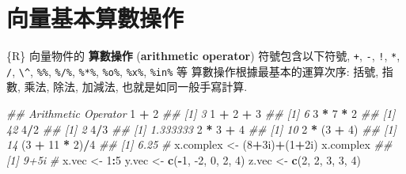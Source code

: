 \documentclass[
]{book}
\newenvironment{Shaded}{\begin{snugshade}}{\end{snugshade}}
\newcommand{\CommentTok}[1]{\textcolor[rgb]{0.56,0.35,0.01}{\textit{#1}}}
\newcommand{\DecValTok}[1]{\textcolor[rgb]{0.00,0.00,0.81}{#1}}
\newcommand{\KeywordTok}[1]{\textcolor[rgb]{0.13,0.29,0.53}{\textbf{#1}}}
\newcommand{\NormalTok}[1]{#1}
\newcommand{\OperatorTok}[1]{\textcolor[rgb]{0.81,0.36,0.00}{\textbf{#1}}}
\newcommand{\StringTok}[1]{\textcolor[rgb]{0.31,0.60,0.02}{#1}}
\begin{document}
\hypertarget{ux5411ux91cfux57faux672cux7b97ux6578ux64cdux4f5c}{%
\section{向量基本算數操作}\label{ux5411ux91cfux57faux672cux7b97ux6578ux64cdux4f5c}}

\{R\} 向量物件的
\textbf{算數操作}
(\textbf{arithmetic operator})
符號包含以下符號,
\texttt{+}, \texttt{-}, \texttt{!}, \texttt{*}, \texttt{/}, \texttt{\textbackslash{}\^{}}, \texttt{\%\%}, \texttt{\%/\%}, \texttt{\%*\%}, \texttt{\%o\%}, \texttt{\%x\%}, \texttt{\%in\%} 等
算數操作根據最基本的運算次序:
括號, 指數, 乘法, 除法, 加減法, 也就是如同一般手寫計算.

\begin{Shaded}
\begin{Highlighting}[]
\CommentTok{\#\# Arithmetic Operator}
\DecValTok{1} \OperatorTok{+}\StringTok{ }\DecValTok{2}
\CommentTok{\#\# [1] 3}
\DecValTok{1} \OperatorTok{+}\StringTok{ }\DecValTok{2} \OperatorTok{+}\StringTok{ }\DecValTok{3}
\CommentTok{\#\# [1] 6}
\DecValTok{3} \OperatorTok{*}\StringTok{ }\DecValTok{7} \OperatorTok{*}\StringTok{ }\DecValTok{2}
\CommentTok{\#\# [1] 42}
\DecValTok{4}\OperatorTok{/}\DecValTok{2}
\CommentTok{\#\# [1] 2}
\DecValTok{4}\OperatorTok{/}\DecValTok{3}
\CommentTok{\#\# [1] 1.333333}
\DecValTok{2} \OperatorTok{*}\StringTok{ }\DecValTok{3} \OperatorTok{+}\StringTok{ }\DecValTok{4}
\CommentTok{\#\# [1] 10}
\DecValTok{2} \OperatorTok{*}\StringTok{ }\NormalTok{(}\DecValTok{3} \OperatorTok{+}\StringTok{ }\DecValTok{4}\NormalTok{)}
\CommentTok{\#\# [1] 14}
\NormalTok{(}\DecValTok{3} \OperatorTok{+}\StringTok{ }\DecValTok{11} \OperatorTok{*}\StringTok{ }\DecValTok{2}\NormalTok{)}\OperatorTok{/}\DecValTok{4}
\CommentTok{\#\# [1] 6.25}
\CommentTok{\#}
\NormalTok{x.complex \textless{}{-}}\StringTok{ }\NormalTok{(}\DecValTok{8}\OperatorTok{+}\NormalTok{3i)}\OperatorTok{+}\NormalTok{(}\DecValTok{1}\OperatorTok{+}\NormalTok{2i)}
\NormalTok{x.complex}
\CommentTok{\#\# [1] 9+5i}
\CommentTok{\#}
\NormalTok{x.vec \textless{}{-}}\StringTok{ }\DecValTok{1}\OperatorTok{:}\DecValTok{5}
\NormalTok{y.vec \textless{}{-}}\StringTok{ }\KeywordTok{c}\NormalTok{(}\OperatorTok{{-}}\DecValTok{1}\NormalTok{, }\DecValTok{{-}2}\NormalTok{, }\DecValTok{0}\NormalTok{, }\DecValTok{2}\NormalTok{, }\DecValTok{4}\NormalTok{)}
\NormalTok{z.vec \textless{}{-}}\StringTok{ }\KeywordTok{c}\NormalTok{(}\DecValTok{2}\NormalTok{, }\DecValTok{2}\NormalTok{, }\DecValTok{3}\NormalTok{, }\DecValTok{3}\NormalTok{, }\DecValTok{4}\NormalTok{)}

\end{Highlighting}
\end{Shaded}
\end{document}
